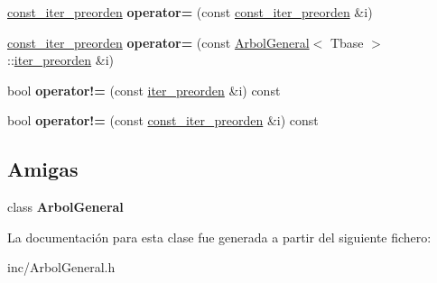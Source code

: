 \begin{DoxyCompactItemize}
\item 
\hyperlink{class_arbol_general_1_1const__iter__preorden}{const\+\_\+iter\+\_\+preorden} {\bfseries operator=} (const \hyperlink{class_arbol_general_1_1const__iter__preorden}{const\+\_\+iter\+\_\+preorden} \&i)\hypertarget{class_arbol_general_1_1const__iter__preorden_a042d100e0517db74c9b299dea18d320b}{}\label{class_arbol_general_1_1const__iter__preorden_a042d100e0517db74c9b299dea18d320b}

\item 
\hyperlink{class_arbol_general_1_1const__iter__preorden}{const\+\_\+iter\+\_\+preorden} {\bfseries operator=} (const \hyperlink{class_arbol_general}{Arbol\+General}$<$ Tbase $>$\+::\hyperlink{class_arbol_general_1_1iter__preorden}{iter\+\_\+preorden} \&i)\hypertarget{class_arbol_general_1_1const__iter__preorden_aa2ac2082374c3b6a6ee5f21ce0803f0d}{}\label{class_arbol_general_1_1const__iter__preorden_aa2ac2082374c3b6a6ee5f21ce0803f0d}

\item 
bool {\bfseries operator!=} (const \hyperlink{class_arbol_general_1_1iter__preorden}{iter\+\_\+preorden} \&i) const \hypertarget{class_arbol_general_1_1const__iter__preorden_a51dd93e7c383154736f5d70e01ede636}{}\label{class_arbol_general_1_1const__iter__preorden_a51dd93e7c383154736f5d70e01ede636}

\item 
bool {\bfseries operator!=} (const \hyperlink{class_arbol_general_1_1const__iter__preorden}{const\+\_\+iter\+\_\+preorden} \&i) const \hypertarget{class_arbol_general_1_1const__iter__preorden_a4c639b21ed7d0773ae1b5a3692ee6edb}{}\label{class_arbol_general_1_1const__iter__preorden_a4c639b21ed7d0773ae1b5a3692ee6edb}

\end{DoxyCompactItemize}
\subsection*{Amigas}
\begin{DoxyCompactItemize}
\item 
class {\bfseries Arbol\+General}\hypertarget{class_arbol_general_1_1const__iter__preorden_a9c06e31b7c3e0d4ee5b03003d32935a5}{}\label{class_arbol_general_1_1const__iter__preorden_a9c06e31b7c3e0d4ee5b03003d32935a5}

\end{DoxyCompactItemize}


La documentación para esta clase fue generada a partir del siguiente fichero\+:\begin{DoxyCompactItemize}
\item 
inc/Arbol\+General.\+h\end{DoxyCompactItemize}
